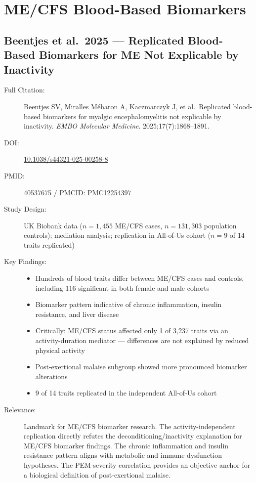 \section{ME/CFS Blood-Based Biomarkers}
\label{sec:bib-mecfs-biomarkers-2026}

\subsection{Beentjes et al.\ 2025 --- Replicated Blood-Based Biomarkers for ME Not Explicable by Inactivity}

\begin{description}
    \item[Full Citation:] Beentjes SV, Miralles M{\'e}haron A, Kaczmarczyk J, et al.\ Replicated blood-based biomarkers for myalgic encephalomyelitis not explicable by inactivity. \textit{EMBO Molecular Medicine}. 2025;17(7):1868--1891. \cite{Beentjes2025Biomarkers}
    \item[DOI:] \href{https://doi.org/10.1038/s44321-025-00258-8}{10.1038/s44321-025-00258-8}
    \item[PMID:] 40537675 / PMCID: PMC12254397
    \item[Study Design:] UK Biobank data ($n=1{,}455$ ME/CFS cases, $n=131{,}303$ population controls); mediation analysis; replication in All-of-Us cohort ($n=9$ of 14 traits replicated)
    \item[Key Findings:]
    \begin{itemize}
        \item Hundreds of blood traits differ between ME/CFS cases and controls, including 116 significant in both female and male cohorts
        \item Biomarker pattern indicative of chronic inflammation, insulin resistance, and liver disease
        \item Critically: ME/CFS status affected only 1 of 3,237 traits via an activity-duration mediator --- differences are not explained by reduced physical activity
        \item Post-exertional malaise subgroup showed more pronounced biomarker alterations
        \item 9 of 14 traits replicated in the independent All-of-Us cohort
    \end{itemize}
    \item[Relevance:] Landmark for ME/CFS biomarker research. The activity-independent replication directly refutes the deconditioning/inactivity explanation for ME/CFS biomarker findings. The chronic inflammation and insulin resistance pattern aligns with metabolic and immune dysfunction hypotheses. The PEM-severity correlation provides an objective anchor for a biological definition of post-exertional malaise.

\end{description}
